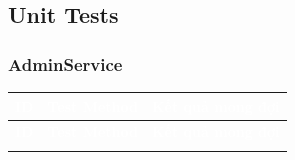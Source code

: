 \documentclass[a4paper]{article}
\begin{document}
\subsection{Unit Tests}

\subsubsection{AdminService}

\begin{longtable}{|C{0.8cm}|L{5.4cm}|L{7.4cm}|}
\hline
{}
\textcolor{white}{\textbf{ID}} &
\textcolor{white}{\textbf{Test Method}} &
\textcolor{white}{\textbf{Kết quả mong đợi}} \\
\hline
\endfirsthead
\hline
{}
\textcolor{white}{\textbf{ID}} &
\textcolor{white}{\textbf{Test Method}} &
\textcolor{white}{\textbf{Kết quả mong đợi}} \\
\hline
\endhead
\hline
\endfoot


\end{longtable}
\end{document}
